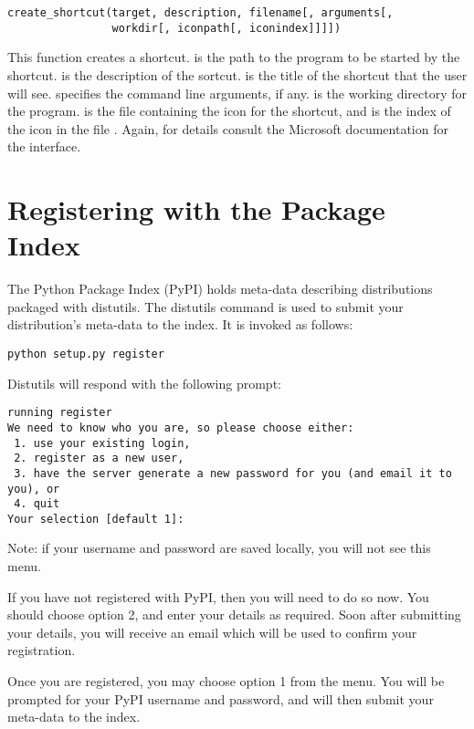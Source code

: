 \documentclass{howto}
\begin{document}
\begin{verbatim}
create_shortcut(target, description, filename[, arguments[,
                workdir[, iconpath[, iconindex]]]])
\end{verbatim}

This function creates a shortcut.
 is the path to the program to be started by the shortcut.
 is the description of the sortcut.
 is the title of the shortcut that the user will see.
 specifies the command line arguments, if any.
 is the working directory for the program.
 is the file containing the icon for the shortcut,
and  is the index of the icon in the file
.  Again, for details consult the Microsoft
documentation for the  interface.

\section{Registering with the Package Index}
\label{package-index}

The Python Package Index (PyPI) holds meta-data describing distributions
packaged with distutils. The distutils command  is
used to submit your distribution's meta-data to the index. It is invoked
as follows:

\begin{verbatim}
python setup.py register
\end{verbatim}

Distutils will respond with the following prompt:

\begin{verbatim}
running register
We need to know who you are, so please choose either:
 1. use your existing login,
 2. register as a new user,
 3. have the server generate a new password for you (and email it to you), or
 4. quit
Your selection [default 1]:
\end{verbatim}

\noindent Note: if your username and password are saved locally, you will
not see this menu.

If you have not registered with PyPI, then you will need to do so now. You
should choose option 2, and enter your details as required. Soon after
submitting your details, you will receive an email which will be used to
confirm your registration.

Once you are registered, you may choose option 1 from the menu. You will
be prompted for your PyPI username and password, and 
will then submit your meta-data to the index.
\end{document}

